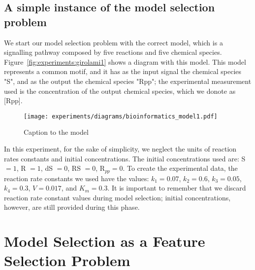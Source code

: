 \subsection{A simple instance of the model selection problem}
We start our model selection problem with the correct model, which is 
a signalling pathway composed by five reactions and five chemical 
species. Figure~\ref{fig:experiments:girolami1} shows a diagram with
this model. This model represents a common motif, and it has as the 
input signal the chemical species "S", and as the output the chemical 
species "Rpp"; the experimental measurement used is the concentration of 
the output chemical species, which we donote as [Rpp].

\begin{figure}
\begin{center}
    \texttt{[image: experiments/diagrams/bioinformatics\_model1.pdf]}
    \caption{Caption to the model}
    \label{fig:experiments:girolami}
    \end{center}

\end{figure}

In this experiment, for the sake of simplicity, we neglect the units of 
reaction rates constants and initial concentrations. The initial 
concentrations used are:  S $= 1$, R $= 1$, dS $= 0$, RS $= 0$, 
R$_{pp} = 0$. To create the experimental data, the reaction rate 
constants we used have the values: 
$k_1 = 0.07$, $k_2 = 0.6$, $k_3 = 0.05$, $k_4 = 0.3$, $V = 0.017$, and
$K_m = 0.3$. It is important to remember that we discard reaction rate
constant values during model selection; initial concentrations, however,
are still provided during this phase.


\section{Model Selection as a Feature Selection Problem}
